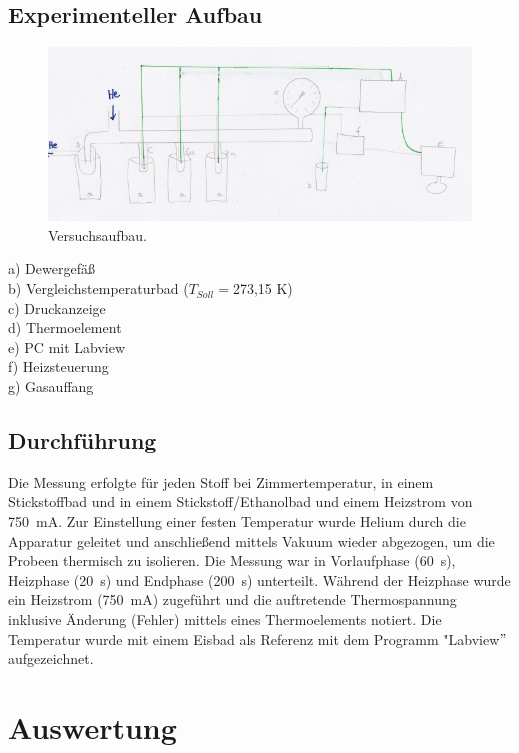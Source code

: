 \documentclass[12pt,a4paper,titlepage,headinclude,bibtotoc]{scrartcl}
\begin{document}
\subsection{Experimenteller Aufbau}

\begin{figure} [h!]
\begin{center}
\includegraphics[scale=0.9]{VersuchsaufbauZeichnung.png} \end{center}
\caption{Versuchsaufbau.}
\end{figure}

a) Dewergefäß\\
b) Vergleichstemperaturbad ($T_{Soll}=$273,15 K)\\
c) Druckanzeige\\
d) Thermoelement\\
e) PC mit Labview\\
f) Heizsteuerung\\
g) Gasauffang\\
\subsection{Durchführung}
Die Messung erfolgte für jeden Stoff bei Zimmertemperatur, in einem Stickstoffbad und in einem Stickstoff/Ethanolbad und einem Heizstrom von 750~mA. Zur Einstellung einer festen Temperatur wurde Helium durch die Apparatur geleitet und anschließend mittels Vakuum wieder abgezogen, um die Probeen thermisch zu isolieren. Die Messung war in Vorlaufphase (60~s), Heizphase (20~s) und Endphase (200~s) unterteilt. Während der Heizphase wurde ein Heizstrom (750~mA) zugeführt und die auftretende Thermospannung inklusive Änderung (Fehler) mittels eines Thermoelements notiert. Die Temperatur wurde mit einem Eisbad als Referenz mit dem Programm "Labview$"$ aufgezeichnet.\\
\section{Auswertung}
\end{document}
